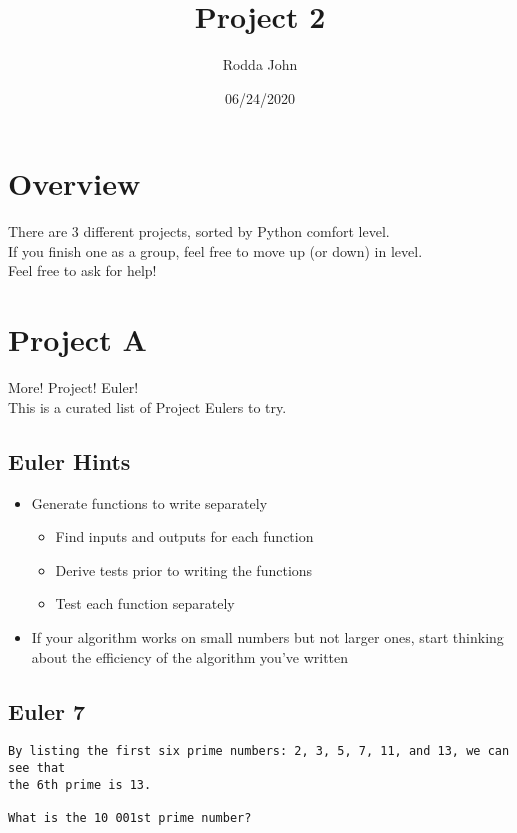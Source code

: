 \documentclass[11pt]{article}
\author{Rodda John}
\date{06/24/2020}
\title{Project 2}
\begin{document}
\maketitle
\setlength\parindent{0pt}

\section{Overview}
\label{sec:orgaaac23b}
There are 3 different projects, sorted by Python comfort level.\\

If you finish one as a group, feel free to move up (or down) in level.\\

Feel free to ask for help!\\
\section{Project A}
\label{sec:orgf96f1b4}
More! Project! Euler!\\

This is a curated list of Project Eulers to try.\\
\subsection{Euler Hints}
\label{sec:org589f8c6}
\begin{itemize}
\item Generate functions to write separately\\
\begin{itemize}
\item Find inputs and outputs for each function\\
\item Derive tests prior to writing the functions\\
\item Test each function separately\\
\end{itemize}
\item If your algorithm works on small numbers but not larger ones, start thinking about the efficiency of the algorithm you've written\\
\end{itemize}

\subsection{Euler 7}
\label{sec:org27ea337}
\begin{verbatim}
By listing the first six prime numbers: 2, 3, 5, 7, 11, and 13, we can see that 
the 6th prime is 13.

What is the 10 001st prime number?
\end{verbatim}
\end{document}
